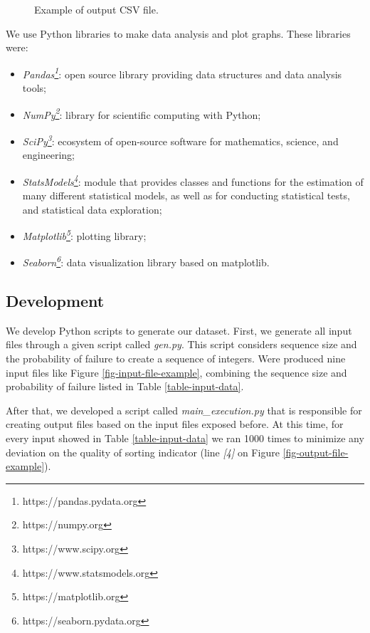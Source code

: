 \begin{figure}[H]
    \centering
    \fbox{
    \theverbbox
    }
    \caption{Example of output CSV file.}
    \label{fig-output-csv-file-example}
\end{figure}

We use Python libraries to make data analysis and plot graphs. These libraries were:
\begin{itemize}
    \item \textit{Pandas\footnote{https://pandas.pydata.org}}: open source library providing data structures and data analysis tools;
    \item \textit{NumPy\footnote{https://numpy.org}}: library for scientific computing with Python;
    \item \textit{SciPy\footnote{https://www.scipy.org}}: ecosystem of open-source software for mathematics, science, and engineering;
    \item \textit{StatsModels\footnote{https://www.statsmodels.org}}: module that provides classes and functions for the estimation of many different statistical models, as well as for conducting statistical tests, and statistical data exploration;
    \item \textit{Matplotlib\footnote{https://matplotlib.org}}: plotting library;
    \item \textit{Seaborn\footnote{https://seaborn.pydata.org}}: data visualization library based on matplotlib.
\end{itemize}

\subsection{Development}

We develop Python scripts to generate our dataset. First, we generate all input files through a given script called \textit{gen.py}. This script considers sequence size and the probability of failure to create a sequence of integers. Were produced nine input files like Figure \ref{fig-input-file-example}, combining the sequence size and probability of failure listed in Table \ref{table-input-data}.

After that, we developed a script called \textit{main\_execution.py} that is responsible for creating output files based on the input files exposed before. At this time, for every input showed in Table \ref{table-input-data} we ran 1000 times to minimize any deviation on the quality of sorting indicator (line \textit{[4]} on Figure \ref{fig-output-file-example}).

